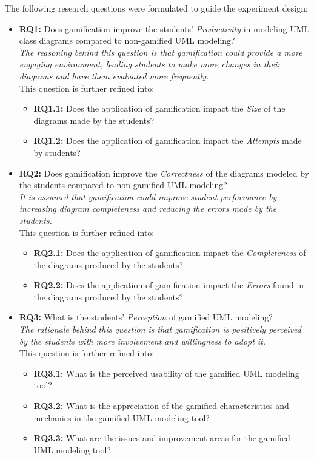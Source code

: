 The following research questions were formulated to guide the experiment design:
\begin{itemize}
    \item \textbf{RQ1:} Does gamification improve the students' \textit{Productivity} in modeling UML class diagrams compared to non-gamified UML modeling?\\
    \emph{The reasoning behind this question is that gamification could provide a more engaging environment, leading students to make more changes in their diagrams and have them evaluated more frequently.}\\
    This question is further refined into:
    \begin{itemize}
        \item \textbf{RQ1.1:} Does the application of gamification impact the \textit{Size} of the diagrams made by the students?
        \item \textbf{RQ1.2:} Does the application of gamification impact the \textit{Attempts} made by students?
    \end{itemize}
    \item \textbf{RQ2:} Does gamification improve the \textit{Correctness} of the diagrams modeled by the students compared to non-gamified UML modeling?\\
    \emph{It is assumed that gamification could improve student performance by increasing diagram completeness and reducing the errors made by the students.}\\
    This question is further refined into:
    \begin{itemize}
        \item \textbf{RQ2.1:} Does the application of gamification impact the \textit{Completeness} of the diagrams produced by the students?
        \item \textbf{RQ2.2:} Does the application of gamification impact the \textit{Errors} found in the diagrams produced by the students?
    \end{itemize}
    \item \textbf{RQ3:} What is the students' \textit{Perception} of gamified UML modeling?\\
    \emph{The rationale behind this question is that gamification is positively perceived by the students with more involvement and willingness to adopt it.}\\
    This question is further refined into:
    \begin{itemize}
        \item \textbf{RQ3.1:} What is the perceived usability of the gamified UML modeling tool?
        \item \textbf{RQ3.2:} What is the appreciation of the gamified characteristics and mechanics in the gamified UML modeling tool?
        \item \textbf{RQ3.3:} What are the issues and improvement areas for the gamified UML modeling tool?
    \end{itemize}
\end{itemize}


